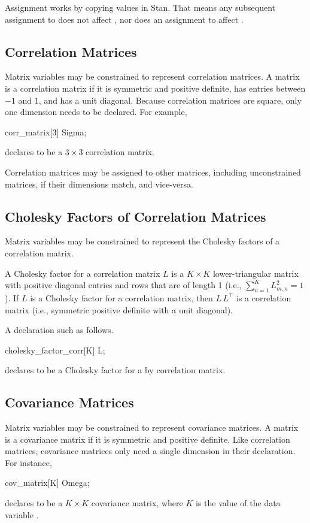Assignment works by copying values in Stan.  That means any subsequent
assignment to  does not affect , nor does an
assignment to  affect .


\subsection{Correlation Matrices}

Matrix variables may be constrained to represent correlation matrices.
A matrix is a correlation matrix if it is symmetric and positive
definite, has entries between $-1$ and $1$, and has a unit diagonal.
Because correlation matrices are square, only one dimension needs
to be declared.  For example,
%
\begin{stancode}
corr_matrix[3] Sigma;
\end{stancode}
%
declares  to be a $3 \times 3$ correlation matrix.

Correlation matrices may be assigned to other matrices, including
unconstrained matrices, if their dimensions match, and vice-versa.

\subsection{Cholesky Factors of Correlation Matrices}

Matrix variables may be constrained to represent the Cholesky factors
of a correlation matrix.

A Cholesky factor for a correlation matrix $L$ is a $K \times K$
lower-triangular matrix with positive diagonal entries and rows that
are of length 1 (i.e., $\sum_{n=1}^K L_{m,n}^2 = 1$).  If $L$ is a
Cholesky factor for a correlation matrix, then $L\,L^{\top}$ is a
correlation matrix (i.e., symmetric positive definite with a unit
diagonal).

A declaration such as
follows.
%
\begin{stancode}
cholesky_factor_corr[K] L;
\end{stancode}
%
declares  to be a Cholesky factor for a  by 
correlation matrix.

\subsection{Covariance Matrices}

Matrix variables may be constrained to represent covariance matrices.
A matrix is a covariance matrix if it is symmetric and positive
definite.  Like correlation matrices, covariance matrices only need a
single dimension in their declaration.  For instance,
%
\begin{stancode}
cov_matrix[K] Omega;
\end{stancode}
%
declares  to be a $K \times K$ covariance matrix, where
$K$ is the value of the data variable .

